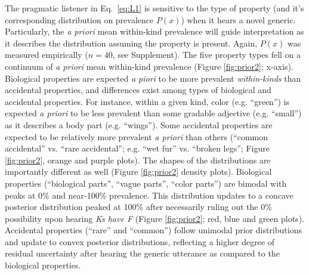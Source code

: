 \documentclass[10pt,letterpaper]{article}
\begin{document}
The pragmatic listener in Eq.~\ref{eq:L1} is sensitive to the type of property (and it's corresponding distribution on prevalence $P(x)$) when it hears a novel generic.
Particularly, the \emph{a priori} mean within-kind prevalence will guide interpretation as it describes the distribution assuming the property is present.
Again, $P(x)$ was measured empirically ($n=40$, see Supplement).
The five property types fell on a continuum of \emph{a priori} mean within-kind prevalence (Figure \ref{fig:prior2}; x-axis). 
Biological properties are expected \emph{a piori} to be more prevalent \emph{within-kinds} than accidental properties, and differences exist among types of biological and accidental properties.
For instance, within a given kind, color (e.g. ``green'') is expected \emph{a priori} to be less prevalent than some gradable adjective (e.g. ``small'') as it describes a body part (e.g. ``wings''). 
Some accidental properties are expected to be relatively more prevalent \emph{a priori} than others (``common accidental'' vs. ``rare accidental''; e.g. ``wet fur'' vs. ``broken legs''; Figure \ref{fig:prior2}, orange and purple plots).
The shapes of the distributions are importantly different as well (Figure \ref{fig:prior2} density plots). 
Biological properties (``biological parts'', ``vague parts'', ``color parts'') are bimodal with peaks at 0\% and near-100\% prevalence. 
This distribution updates to a concave posterior distribution peaked at 100\% after necessarily ruling out the 0\% possibility upon hearing \emph{Ks have F} (Figure \ref{fig:prior2}; red, blue and green plots). 
Accidental properties (``rare'' and ``common'') follow unimodal prior distributions and update to convex posterior distributions, reflecting a higher degree of residual uncertainty after hearing the generic utterance as compared to the biological properties. 

\end{document}
